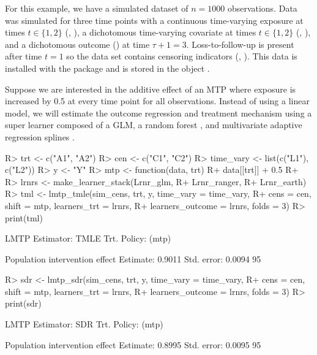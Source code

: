 \documentclass[]{jss}
\begin{document}
For this
example, we have a simulated dataset of \(n = 1000\) observations. Data
was simulated for three time points with a continuous time-varying
exposure at times \(t \in \{1, 2\}\) (, ), a
dichotomous time-varying covariate at times \(t \in \{1, 2\}\)
(, ), and a dichotomous outcome () at time
\(\tau + 1 = 3\). Loss-to-follow-up is present after time \(t = 1\) so the data set
contains censoring indicators (, ). This data is
installed with the package and is stored in the object .

Suppose we are interested in the additive effect of an MTP where exposure
is increased by 0.5 at every time point for all observations. Instead of using a linear model, 
we will estimate the outcome regression and treatment mechanism using a super learner 
composed of a GLM, a random forest \citep{wrightRanger}, 
and multivariate adaptive regression splines \citep{milborrowEarth}. 

\begin{CodeChunk}

\begin{CodeInput}
R> trt <- c("A1", "A2")
R> cen <- c("C1", "C2")
R> time_vary <- list(c("L1"), c("L2"))
R> y <- "Y"
R> mtp <- function(data, trt) {
R+   data[[trt]] + 0.5
R+ }
R> lrnrs <- make_learner_stack(Lrnr_glm,
R+                             Lrnr_ranger, 
R+                             Lrnr_earth)
R> tml <- lmtp_tmle(sim_cens, trt, y, time_vary = time_vary, 
R+                  cens = cen, shift = mtp, learners_trt = lrnrs, 
R+                  learners_outcome = lrnrs, folds = 3)
R> print(tml)
\end{CodeInput}

\begin{CodeOutput}
LMTP Estimator: TMLE
   Trt. Policy: (mtp)

Population intervention effect
      Estimate: 0.9011
    Std. error: 0.0094
        95%
\end{CodeOutput}

\begin{CodeInput}
R> sdr <- lmtp_sdr(sim_cens, trt, y, time_vary = time_vary, 
R+                 cens = cen, shift = mtp, learners_trt = lrnrs, 
R+                 learners_outcome = lrnrs, folds = 3)
R> print(sdr)
\end{CodeInput}

\begin{CodeOutput}
LMTP Estimator: SDR
   Trt. Policy: (mtp)

Population intervention effect
      Estimate: 0.8995
    Std. error: 0.0095
        95%
\end{CodeOutput}

\end{CodeChunk}
\end{document}

